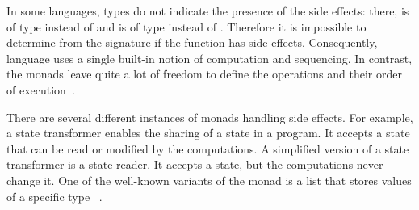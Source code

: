 \begin{frame}
In some languages, types do not indicate the presence of the side effects: there,  is of type  instead of  and  is of type  instead of . Therefore it is impossible to determine from the signature if the function has side effects. Consequently, language uses a single built-in notion of computation and sequencing. In contrast, the monads leave quite a lot of freedom to define the operations and their order of execution~\cite{history-of-haskell}.

There are several different instances of monads handling side effects. For example, a state transformer enables the sharing of a state in a program. It accepts a state that can be read or modified by the computations. A simplified version of a state transformer is a state reader. It accepts a state, but the computations never change it. One of the well-known variants of the monad is a list that stores values of a specific type ~\cite{history-of-haskell}.


\end{frame}

